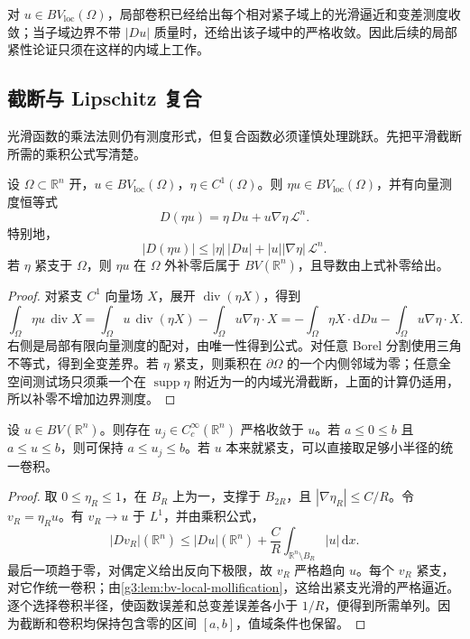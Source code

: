 对 \(u\in BV_{\mathrm{loc}}(\Omega)\)，局部卷积已经给出每个相对紧子域上的光滑逼近和变差测度收敛；当子域边界不带 \(|Du|\) 质量时，还给出该子域中的严格收敛。因此后续的局部紧性论证只须在这样的内域上工作。

\subsection{截断与 Lipschitz 复合}
\label{g3:subsec:2101:04}
光滑函数的乘法法则仍有测度形式，但复合函数必须谨慎处理跳跃。先把平滑截断所需的乘积公式写清楚。

\begin{proposition}\label{g3:prop:bv-smooth-product}
	设 \(\Omega\subset\mathbb R^n\) 开，\(u\in BV_{\mathrm{loc}}(\Omega)\)，\(\eta\in C^1(\Omega)\)。则 \(\eta u\in BV_{\mathrm{loc}}(\Omega)\)，并有向量测度恒等式
	\begin{equation}\label{g3:eq:bv-smooth-product}
		D(\eta u)=\eta\,Du+u\nabla\eta\,\mathcal L^n.
	\end{equation}
	特别地，
	\[
		|D(\eta u)|\le|\eta|\,|Du|+|u||\nabla\eta|\,\mathcal L^n.
	\]
	若 \(\eta\) 紧支于 \(\Omega\)，则 \(\eta u\) 在 \(\Omega\) 外补零后属于 \(BV(\mathbb R^n)\)，且导数由上式补零给出。
\end{proposition}
\begin{proof}
	对紧支 \(C^1\) 向量场 \(X\)，展开 \(\operatorname{div}(\eta X)\)，得到
	\[
		\int_\Omega\eta u\,\operatorname{div}X
		=\int_\Omega u\,\operatorname{div}(\eta X)
		-\int_\Omega u\nabla\eta\cdot X
		=-\int_\Omega\eta X\cdot\mathrm dDu
		-\int_\Omega u\nabla\eta\cdot X.
	\]
	右侧是局部有限向量测度的配对，由唯一性得到公式。对任意 Borel 分割使用三角不等式，得到全变差界。若 \(\eta\) 紧支，则乘积在 \(\partial\Omega\) 的一个内侧邻域为零；任意全空间测试场只须乘一个在 \(\operatorname{supp}\eta\) 附近为一的内域光滑截断，上面的计算仍适用，所以补零不增加边界测度。
\end{proof}

\begin{corollary}\label{g3:cor:bv-compact-smooth-approximation}
	设 \(u\in BV(\mathbb R^n)\)。则存在 \(u_j\in C_c^\infty(\mathbb R^n)\) 严格收敛于 \(u\)。若 \(a\le0\le b\) 且 \(a\le u\le b\)，则可保持 \(a\le u_j\le b\)。若 \(u\) 本来就紧支，可以直接取足够小半径的统一卷积。
\end{corollary}
\begin{proof}
	取 \(0\le\eta_R\le1\)，在 \(B_R\) 上为一，支撑于 \(B_{2R}\)，且 \(|\nabla\eta_R|\le C/R\)。令 \(v_R=\eta_Ru\)。有 \(v_R\to u\) 于 \(L^1\)，并由乘积公式，
	\[
		|Dv_R|(\mathbb R^n)
		\le |Du|(\mathbb R^n)
		+\frac CR\int_{\mathbb R^n\setminus B_R}|u|\,\mathrm dx.
	\]
	最后一项趋于零，对偶定义给出反向下极限，故 \(v_R\) 严格趋向 \(u\)。每个 \(v_R\) 紧支，对它作统一卷积；由\cref{g3:lem:bv-local-mollification}，这给出紧支光滑的严格逼近。逐个选择卷积半径，使函数误差和总变差误差各小于 \(1/R\)，便得到所需单列。因为截断和卷积均保持包含零的区间 \([a,b]\)，值域条件也保留。
\end{proof}

